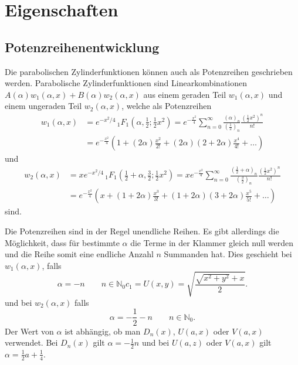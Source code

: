 %
%
%
\section{Eigenschaften
	\label{parzyl:section:Eigenschaften}}

\subsection{Potenzreihenentwicklung
	\label{parzyl:potenz}}
Die parabolischen Zylinderfunktionen können auch als Potenzreihen geschrieben werden.
Parabolische Zylinderfunktionen sind Linearkombinationen 
$A(\alpha)w_1(\alpha, x) + B(\alpha)w_2(\alpha, x)$ aus einem geraden Teil $w_1(\alpha, x)$ 
und einem ungeraden Teil $w_2(\alpha, x)$, welche als Potenzreihen
\begin{align}
	w_1(\alpha,x)
	&=  
	e^{-x^2/4} \,
	{}_{1} F_{1}
	(
	\alpha, {\textstyle \frac{1}{2}} ; {\textstyle \frac{1}{2}}x^2) 
	= 
	e^{-\frac{x^2}{4}}
	\sum^{\infty}_{n=0}
	\frac{\left ( \alpha \right )_{n}}{\left ( \frac{1}{2}\right )_{n}}
	\frac{\left ( \frac{1}{2} x^2\right )^n}{n!} \\
	&=
	e^{-\frac{x^2}{4}}
	\left ( 
	1 
	+
	\left ( 2\alpha \right )\frac{x^2}{2!}
	+
	\left ( 2\alpha \right )\left ( 2 + 2\alpha \right )\frac{x^4}{4!}  
	+
	\dots
	\right )
\end{align}
und
\begin{align}
	w_2(\alpha,x)
	&=  
	xe^{-x^2/4} \,
	{}_{1} F_{1}
	(
	{\textstyle \frac{1}{2}} 
	+ \alpha, {\textstyle \frac{3}{2}} ; {\textstyle \frac{1}{2}}x^2) 
	= 
	xe^{-\frac{x^2}{4}}
	\sum^{\infty}_{n=0}
	\frac{\left ( \frac{1}{2} + \alpha \right )_{n}}{\left ( \frac{3}{2}\right )_{n}}
	\frac{\left ( \frac{1}{2} x^2\right )^n}{n!} \\
	&=
	e^{-\frac{x^2}{4}}
	\left ( 
	x 
	+
	\left ( 1 + 2\alpha \right )\frac{x^3}{3!}
	+
	\left ( 1 + 2\alpha \right )\left ( 3 + 2\alpha \right )\frac{x^5}{5!}  
	+
	\dots
	\right )
\end{align}
sind.


Die Potenzreihen sind in der Regel unendliche Reihen. 
Es gibt allerdings die Möglichkeit, dass für bestimmte $\alpha$ die Terme in der Klammer gleich null werden 
und die Reihe somit eine endliche Anzahl $n$ Summanden hat.
Dies geschieht bei $w_1(\alpha,x)$, falls
\begin{equation}
	\alpha =  -n \qquad n \in \mathbb{N}_0
	c_1 = U(x,y) = \sqrt{\frac{\sqrt{x^2+y^2} + x}{2}}.
\end{equation}
und bei $w_2(\alpha,x)$ falls
\begin{equation}
	\alpha = -\frac{1}{2} - n \qquad n \in \mathbb{N}_0.
\end{equation}
Der Wert von $\alpha$ ist abhängig, ob man $D_n(x)$, $U(a,x)$ oder $V(a,x)$ verwendet.
Bei $D_n(x)$ gilt $\alpha = -{\textstyle \frac{1}{2}} n$ und bei $U(a,z)$ oder $V(a,x)$ gilt 
$\alpha = {\textstyle \frac{1}{2}} a + {\textstyle \frac{1}{4}}$.
